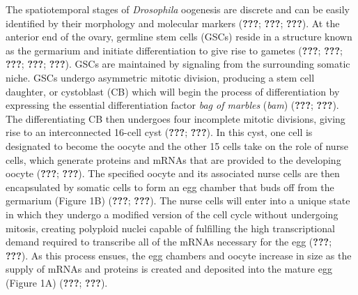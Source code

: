 \documentclass[12pt,oneside]{reedthesis}
\begin{document}
The spatiotemporal stages of \emph{Drosophila} oogenesis are discrete and can
be easily identified by their morphology and molecular markers
({\textbf{???}}; {\textbf{???}}; {\textbf{???}}). At the anterior end of
the ovary, germline stem cells (GSCs) reside in a structure known as the
germarium and initiate differentiation to give rise to gametes
({\textbf{???}}; {\textbf{???}}; {\textbf{???}}; {\textbf{???}}; {\textbf{???}}). GSCs
are maintained by signaling from the surrounding somatic niche. GSCs
undergo asymmetric mitotic division, producing a stem cell daughter, or
cystoblast (CB) which will begin the process of differentiation by
expressing the essential differentiation factor \emph{bag of marbles} (\emph{bam})
({\textbf{???}}; {\textbf{???}}). The differentiating CB then undergoes
four incomplete mitotic divisions, giving rise to an interconnected
16-cell cyst ({\textbf{???}}; {\textbf{???}}). In this cyst, one
cell is designated to become the oocyte and the other 15 cells take on
the role of nurse cells, which generate proteins and mRNAs that are
provided to the developing oocyte ({\textbf{???}}; {\textbf{???}}).
The specified oocyte and its associated nurse cells are then
encapsulated by somatic cells to form an egg chamber that buds off from
the germarium (Figure 1B) ({\textbf{???}}; {\textbf{???}}). The nurse
cells will enter into a unique state in which they undergo a modified
version of the cell cycle without undergoing mitosis, creating polyploid
nuclei capable of fulfilling the high transcriptional demand required to
transcribe all of the mRNAs necessary for the egg ({\textbf{???}}; {\textbf{???}}). As this process ensues, the egg chambers and oocyte
increase in size as the supply of mRNAs and proteins is created and
deposited into the mature egg (Figure 1A) ({\textbf{???}}; {\textbf{???}}).
\end{document}
